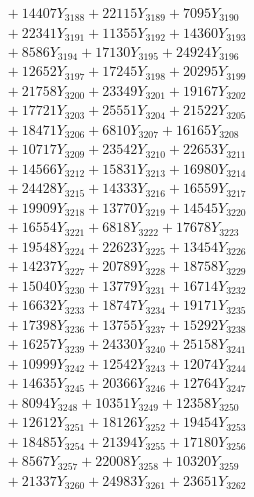 \documentclass[a4paper,10pt]{article}
\begin{document}
{\begin{align}
&\;  + 14407 Y_{3188} + 22115 Y_{3189} + 7095 Y_{3190} \\[0.3ex]
&\;  + 22341 Y_{3191} + 11355 Y_{3192} + 14360 Y_{3193} \\[0.3ex]
&\;  + 8586 Y_{3194} + 17130 Y_{3195} + 24924 Y_{3196} \\[0.3ex]
&\;  + 12652 Y_{3197} + 17245 Y_{3198} + 20295 Y_{3199} \\[0.3ex]
&\;  + 21758 Y_{3200} + 23349 Y_{3201} + 19167 Y_{3202} \\[0.3ex]
&\;  + 17721 Y_{3203} + 25551 Y_{3204} + 21522 Y_{3205} \\[0.3ex]
&\;  + 18471 Y_{3206} + 6810 Y_{3207} + 16165 Y_{3208} \\[0.5ex]\allowbreak
&\;  + 10717 Y_{3209} + 23542 Y_{3210} + 22653 Y_{3211} \\[0.3ex]
&\;  + 14566 Y_{3212} + 15831 Y_{3213} + 16980 Y_{3214} \\[0.3ex]
&\;  + 24428 Y_{3215} + 14333 Y_{3216} + 16559 Y_{3217} \\[0.3ex]
&\;  + 19909 Y_{3218} + 13770 Y_{3219} + 14545 Y_{3220} \\[0.3ex]
&\;  + 16554 Y_{3221} + 6818 Y_{3222} + 17678 Y_{3223} \\[0.3ex]
&\;  + 19548 Y_{3224} + 22623 Y_{3225} + 13454 Y_{3226} \\[0.3ex]
&\;  + 14237 Y_{3227} + 20789 Y_{3228} + 18758 Y_{3229} \\[0.3ex]
&\;  + 15040 Y_{3230} + 13779 Y_{3231} + 16714 Y_{3232} \\[0.3ex]
&\;  + 16632 Y_{3233} + 18747 Y_{3234} + 19171 Y_{3235} \\[0.3ex]
&\;  + 17398 Y_{3236} + 13755 Y_{3237} + 15292 Y_{3238} \\[0.5ex]\allowbreak
&\;  + 16257 Y_{3239} + 24330 Y_{3240} + 25158 Y_{3241} \\[0.3ex]
&\;  + 10999 Y_{3242} + 12542 Y_{3243} + 12074 Y_{3244} \\[0.3ex]
&\;  + 14635 Y_{3245} + 20366 Y_{3246} + 12764 Y_{3247} \\[0.3ex]
&\;  + 8094 Y_{3248} + 10351 Y_{3249} + 12358 Y_{3250} \\[0.3ex]
&\;  + 12612 Y_{3251} + 18126 Y_{3252} + 19454 Y_{3253} \\[0.3ex]
&\;  + 18485 Y_{3254} + 21394 Y_{3255} + 17180 Y_{3256} \\[0.3ex]
&\;  + 8567 Y_{3257} + 22008 Y_{3258} + 10320 Y_{3259} \\[0.3ex]
&\;  + 21337 Y_{3260} + 24983 Y_{3261} + 23651 Y_{3262} \\[0.3ex]

\end{align}}
\end{document}

